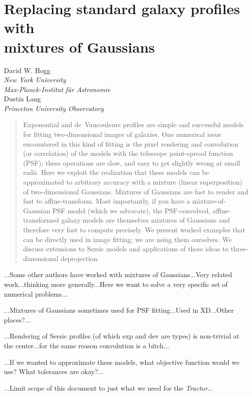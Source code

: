 \documentclass[12pt]{article}
\newcommand{\project}[1]{\textsl{#1}}
\newcommand{\tractor}{\project{Tractor}}
\begin{document}
\section*{Replacing standard galaxy profiles with \\ mixtures of Gaussians}

\noindent
David W. Hogg \\
\textsl{New York University} \\
\textsl{Max-Planck-Institut f\"ur Astronomie} \\[1ex]
Dustin Lang \\
\textsl{Princeton University Observatory}

\begin{abstract}
Exponential and de~Vaucouleurs profiles are simple and successful
models for fitting two-dimensional images of galaxies.  One numerical
issue encountered in this kind of fitting is the pixel rendering and
convolution (or correlation) of the models with the telescope
point-spread function (PSF); these operations are slow, and easy to
get slightly wrong at small radii.  Here we exploit the realization
that these models can be approximated to arbitrary accuracy with a
mixture (linear superposition) of two-dimensional Gaussians.  Mixtures
of Gaussians are fast to render and fast to affine-transform.  Most
importantly, if you have a mixture-of-Gaussian PSF model (which we
advocate), the PSF-convolved, affine-transformed galaxy models are
themselves mixtures of Gaussians and therefore very fast to compute
precisely.  We present worked examples that can be directly used in
image fitting; we are using them ourselves.  We discuss extensions to
Sersic models and applications of these ideas to three-dimensional
deprojection.
\end{abstract}

...Some other authors have worked with mixtures of Gaussians...Very
related work...thinking more generally...Here we want to solve a very
specific set of numerical problems...

...Mixtures of Gaussians sometimes used for PSF fitting...Used in
XD...Other places?...

...Rendering of Sersic profiles (of which exp and dev are types) is
non-trivial at the center...for the same reason convolution is a
bitch...

...If we wanted to approximate these models, what objective function
would we use?  What tolerances are okay?...

...Limit scope of this document to just what we need for the
\tractor...
\end{document}
